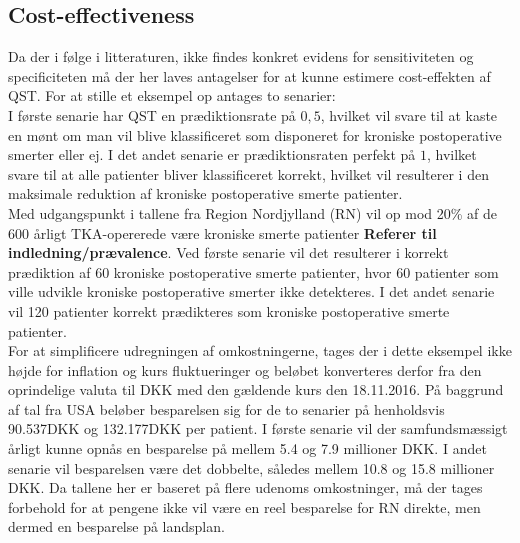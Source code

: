 \subsection{Cost-effectiveness}
Da der i følge  i litteraturen, ikke findes konkret evidens for sensitiviteten og specificiteten må der her laves antagelser for at kunne estimere cost-effekten af QST. For at stille et eksempel op antages to senarier: \\
I første senarie har QST en prædiktionsrate på $0,5$, hvilket vil svare til at kaste en mønt om man vil blive klassificeret som disponeret for kroniske postoperative smerter eller ej.
I det andet senarie er prædiktionsraten perfekt på $1$, hvilket svare til at alle patienter bliver klassificeret korrekt, hvilket vil resulterer i den maksimale reduktion af kroniske postoperative smerte patienter. \\
Med udgangspunkt i tallene fra Region Nordjylland (RN) vil op mod 20\% af de 600 årligt TKA-opererede være kroniske smerte patienter \textbf{Referer til indledning/prævalence}. Ved første senarie vil det resulterer i korrekt prædiktion af 60 kroniske postoperative smerte patienter, hvor 60 patienter som ville udvikle kroniske postoperative smerter ikke detekteres. I det andet senarie vil 120 patienter korrekt prædikteres som kroniske postoperative smerte patienter. \\
For at simplificere udregningen af omkostningerne, tages der i dette eksempel ikke højde for inflation og kurs fluktueringer og beløbet konverteres derfor fra den oprindelige valuta til DKK med den gældende kurs den 18.11.2016.
På baggrund af tal fra USA beløber besparelsen sig for de to senarier på henholdsvis 90.537DKK og 132.177DKK per patient. I første senarie vil der samfundsmæssigt årligt kunne opnås en besparelse på mellem 5.4 og 7.9 millioner DKK. I andet senarie vil besparelsen være det dobbelte, således mellem 10.8 og 15.8 millioner DKK. Da tallene her er baseret på flere udenoms omkostninger, må der tages forbehold for at pengene ikke vil være en reel besparelse for RN direkte, men dermed en besparelse på landsplan.



